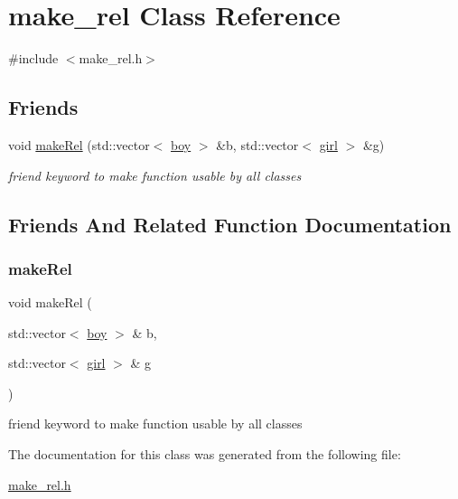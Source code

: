 \hypertarget{classmake__rel}{}\section{make\+\_\+rel Class Reference}
\label{classmake__rel}


{\ttfamily \#include $<$make\+\_\+rel.\+h$>$}

\subsection*{Friends}
\begin{DoxyCompactItemize}
\item 
void \hyperlink{classmake__rel_a2b7cdefda7888df96abec3086bd10128}{make\+Rel} (std\+::vector$<$ \hyperlink{classboy}{boy} $>$ \&b, std\+::vector$<$ \hyperlink{classgirl}{girl} $>$ \&g)
\begin{DoxyCompactList}\small\item\em friend keyword to make function usable by all classes \end{DoxyCompactList}\end{DoxyCompactItemize}


\subsection{Friends And Related Function Documentation}
\mbox{\label{classmake__rel_a2b7cdefda7888df96abec3086bd10128}} 
\subsubsection{\texorpdfstring{make\+Rel}{makeRel}}
{\footnotesize\ttfamily void make\+Rel (\begin{DoxyParamCaption}\item[{std\+::vector$<$ \hyperlink{classboy}{boy} $>$ \&}]{b,  }\item[{std\+::vector$<$ \hyperlink{classgirl}{girl} $>$ \&}]{g }\end{DoxyParamCaption})\hspace{0.3cm}{\ttfamily [friend]}}



friend keyword to make function usable by all classes 



The documentation for this class was generated from the following file\+:\begin{DoxyCompactItemize}
\item 
\hyperlink{make__rel_8h}{make\+\_\+rel.\+h}\end{DoxyCompactItemize}
